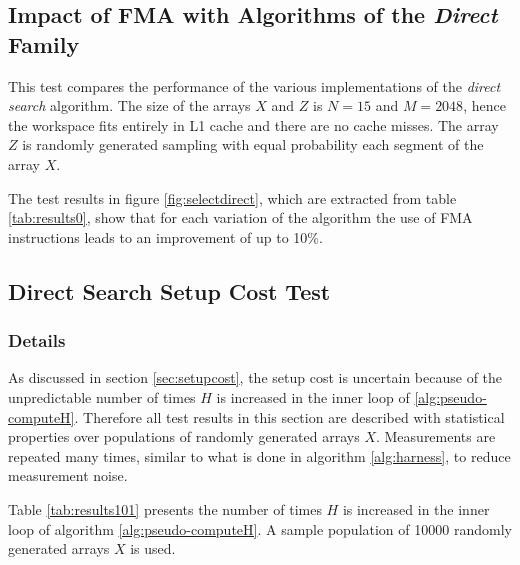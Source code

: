 \documentclass[preprint,1p,times]{elsarticle}
\begin{document}
\subsection{Impact of FMA with Algorithms of the \textit{Direct} Family}
\label{sec:testFMA}
This test compares the performance of the various implementations of the \textit{direct search} algorithm.
The size of the arrays $X$ and $Z$ is $N=15$ and $M=2048$, hence the workspace fits entirely in L1 cache and there are no cache misses. 
The array $Z$ is randomly generated sampling with equal probability each segment of the array $X$.

The test results in figure \ref{fig:selectdirect}, which are extracted from table \ref{tab:results0}, show  
that for each variation of the algorithm the use of FMA instructions leads to an improvement of up to 10\%.

\subsection{Direct Search Setup Cost Test}
\label{sec:setuptests}
\subsubsection{Details}
As discussed in section \ref{sec:setupcost}, the setup cost is uncertain because of the unpredictable number of times $H$ is increased in the inner loop of \ref{alg:pseudo-computeH}. Therefore all test results in this section are described with statistical properties over populations of randomly generated arrays $X$. Measurements are repeated many times, similar to what is done in algorithm \ref{alg:harness}, to reduce measurement noise.

Table \ref{tab:results101} presents the number of times $H$ is increased in the inner loop of algorithm \ref{alg:pseudo-computeH}. A sample population of 10000 randomly generated arrays $X$ is used.
\end{document}
